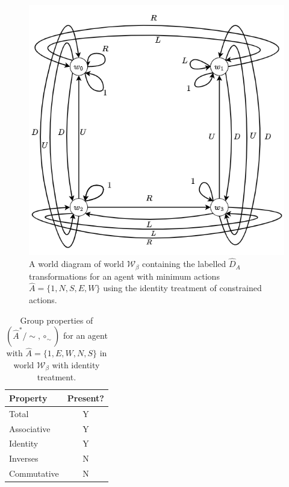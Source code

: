 \begin{figure}[H]
    \centering
    \includegraphics[width=0.75\linewidth]{5BeyondSBDRL/GlobalAlgebras/Images/identity_walls_2x2_cyclical_min_actions.drawio.png}
    \caption{
        A world diagram of world $\mathscr{W}_{\beta}$ containing the labelled $\hat{D}_{A}$ transformations for an agent with minimum actions $\hat{A} = \{1, N, S, E, W\}$ using the identity treatment of constrained actions.
    }
    \label{fig:2x2_gridworld_minimum_transitions_wall_identity}
\end{figure}

\begin{table}[H]
\centering
\begin{tabular}{lc}
\hline
\textbf{Property} & \textbf{Present?} \\
\hline
Total & Y \\
Associative & Y \\
Identity & Y \\
Inverses & N \\
\hline
Commutative & N \\
\end{tabular}
\caption{
Group properties of $(\hat{A}^{*}/\sim, \circ_{\sim})$ for an agent with $\hat{A} = \{1, E, W, N, S \}$ in world $\mathscr{W}_{\beta}$ with identity treatment.
}
\end{table}


\begin{fullwidth}
\begin{landscape}
\setlength{\tabcolsep}{2pt}
{\fontsize{8}{10}\selectfont

}
\setlength{\tabcolsep}{6pt}
\end{landscape}
\end{fullwidth}


